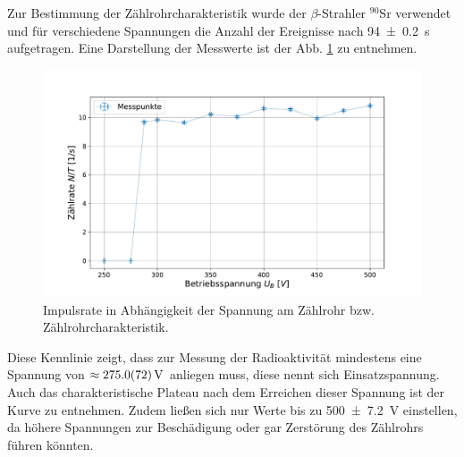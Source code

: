 	Zur Bestimmung der Zählrohrcharakteristik wurde der $\beta$-Strahler $^{90}$Sr verwendet und für verschiedene Spannungen die Anzahl der Ereignisse nach \SI{94+-0,2}{\second} aufgetragen. 
	Eine Darstellung der Messwerte ist der Abb. \ref{fig:Kennlinie} zu entnehmen.
	\begin{figure}[ht]
		\centering
		\includegraphics[width=\textwidth]{data/CharakteristikZaehlrohr.pdf}
		\caption{Impulsrate in Abhängigkeit der Spannung am Zählrohr bzw. Zählrohrcharakteristik.}
		\label{fig:Kennlinie}	
	\end{figure}
	Diese Kennlinie zeigt, dass zur Messung der Radioaktivität mindestens eine Spannung von $\approx \SI{275+-7,2}{\volt}$ anliegen muss, diese nennt sich Einsatzspannung. 
	Auch das charakteristische Plateau nach dem Erreichen dieser Spannung ist der Kurve zu entnehmen.
	Zudem ließen sich nur Werte bis zu \SI{500+-7,2}{\volt} einstellen, da höhere Spannungen zur Beschädigung oder gar Zerstörung des Zählrohrs führen könnten. 
	
